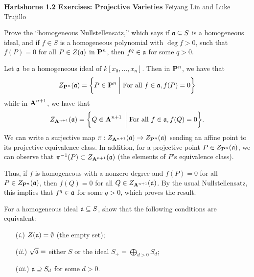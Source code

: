 \documentclass[10pt]{amsart}
\newcommand{\header}[2]{
    {\noindent
    {\Large \bf Hartshorne #1 Exercises: #2}
    \hfill 
    {\large Feiyang Lin and Luke Trujillo}
    \vspace{0.5cm}}
}
\begin{document}
\header{1.2}{Projective Varieties}

\begin{exercise}[Exercise 2.1]
    Prove the ``homogeneous Nullstellensatz,'' which says if $\fa
    \subseteq S$ is a homogeneous ideal, and if $f \in S$ is a homogeneous
    polynomial with $\deg f > 0$, such that $f(P) = 0$ for all $P \in
    Z(\fa)$ in $\bbP^n$, then $f^q \in \fa$ for some $q >
    0$.
\end{exercise}

\begin{solution}
    \begin{luke}
    Let $\idl{a}$ be a homogeneous ideal of $k[x_0, \dots, x_n]$. 
    Then in $\bbP^n$, we have that  
    \[
        Z_{\pp^n}(\idl{a}) = \bigg\{ P \in \bbP^n \;\bigg|\; \text{For all } f \in \idl{a}, f(P) = 0  \bigg\}
    \]
    while in $\aa^{n+1}$, we have that 
    \[
        Z_{\aa^{n+1}}(\idl{a}) = \bigg\{ Q \in \aa^{n+1} \;\bigg|\; \text{For all } f \in \idl{a}, f(Q) = 0  \bigg\}.
    \]
    We can write a surjective map $\pi: Z_{\aa^{n+1}}(\idl{a}) \to Z_{\pp^n}(\idl{a})$ sending an affine point to its projective 
    equivalence class.
    In addition, for a projective point $P \in Z_{\pp^n}(\idl{a})$, we can observe that 
    $\pi^{-1}(P) \subset Z_{\aa^{n+1}}(\idl{a})$ (the elements of $P$'s equivalence class). 
    
    Thus, if $f$ is homogeneous with a nonzero degree and $f(P) = 0$ for all $P \in Z_{\pp^n}(\idl{a})$, 
    then $f(Q) = 0$ for all $Q \in Z_{\aa^{n+1}}(\idl{a})$. By the usual Nullstellensatz, 
    this implies that $f^q \in \idl{a}$ for some $q > 0$, which proves the result. 
    \end{luke}
\end{solution}

\begin{exercise}[Exercise 2.2]
    For a homogeneous ideal $\fa \subseteq S$, show that the following
    conditions are equivalent:
    \begin{itemize}
        \item[(\emph{i}.)] $Z(\fa) = \emptyset$ (the empty set);
        \item[(\emph{ii}.)] $\sqrt{\fa} =$ either $S$ or the ideal $S_+ =
        \bigoplus_{d > 0}S_d$;
        \item[(\emph{iii}.)] $\fa \supseteq S_d$ for some $d > 0$. 
    \end{itemize}
\end{exercise}
\end{document}

